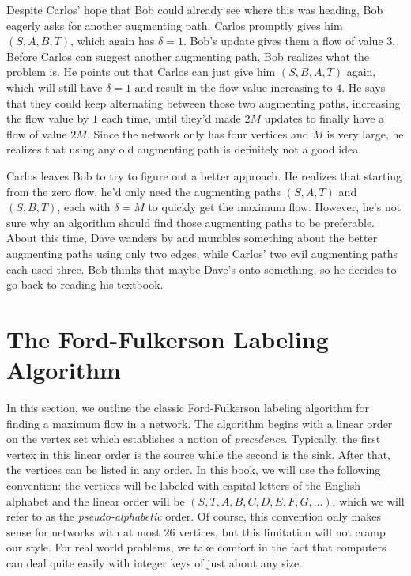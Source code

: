 Despite Carlos' hope that Bob could already see where this was
heading, Bob eagerly asks for another augmenting path. Carlos promptly
gives him $(S,A,B,T)$, which again has $\delta=1$. Bob's update gives
them a flow of value $3$. Before Carlos can suggest another augmenting
path, Bob realizes what the problem is. He points out that Carlos can
just give him $(S,B,A,T)$ again, which will still have $\delta=1$ and
result in the flow value increasing to $4$. He says that they could
keep alternating between those two augmenting paths, increasing the
flow value by $1$ each time, until they'd made $2M$ updates to finally
have a flow of value $2M$. Since the network only has four vertices
and $M$ is very large, he realizes that using any old augmenting path
is definitely not a good idea.

Carlos leaves Bob to try to figure out a better approach. He realizes
that starting from the zero flow, he'd only need the augmenting paths
$(S,A,T)$ and $(S,B,T)$, each with $\delta=M$ to quickly get the
maximum flow. However, he's not sure why an algorithm should find
those augmenting paths to be preferable. About this time, Dave wanders
by and mumbles something about the better augmenting paths using only
two edges, while Carlos' two evil augmenting paths each used
three. Bob thinks that maybe Dave's onto something, so he decides to
go back to reading his textbook.

\section{The Ford-Fulkerson Labeling Algorithm}

In this section, we outline the classic Ford-Fulkerson labeling
algorithm for finding a maximum flow in a network.  The algorithm
begins with a linear order on the vertex set which establishes a
notion of \textit{precedence}.  Typically, the first vertex in this
linear order is the source while the second is the sink.  After that,
the vertices can be listed in any order.  In this book, we will use
the following convention: the vertices will be labeled with capital
letters of the English alphabet and the linear order will be
$(S,T,A,B,C,D,E,F,G,\dots)$, which we will refer to as the
\textit{pseudo-alphabetic} order.  Of course, this convention only
makes sense for networks with at most $26$ vertices, but this
limitation will not cramp our style.  For real world problems, we take
comfort in the fact that computers can deal quite easily with integer
keys of just about any size.

